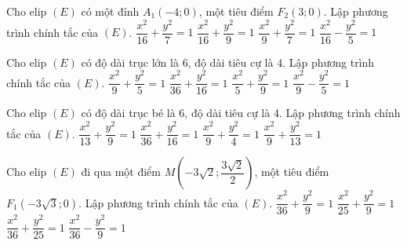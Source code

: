 \begin{ex}%
	Cho elip $(E)$ có  một đỉnh $A_1(-4;0)$, một tiêu điểm $F_2(3;0)$. Lập phương trình chính tắc của $(E)$.
	 \choice
		{ \True $\dfrac{x^2}{16}+\dfrac{y^2}{7}=1$} 
		 {$\dfrac{x^2}{16}+\dfrac{y^2}{9}=1$}
		{  $\dfrac{x^2}{9}+\dfrac{y^2}{7}=1$}
		{$\dfrac{x^2}{16}-\dfrac{y^2}{5}=1$} 
\end{ex}

\begin{ex}%
	Cho elip $(E)$ có độ dài trục lớn là $6$, độ dài  tiêu cự là $4$. Lập phương trình chính tắc của $(E)$.
	\choice 
		 { \True $\dfrac{x^2}{9}+\dfrac{y^2}{5}=1$}
		 {$\dfrac{x^2}{36}+\dfrac{y^2}{16}=1$}
		{  $\dfrac{x^2}{5}+\dfrac{y^2}{9}=1$}
		 {$\dfrac{x^2}{9}-\dfrac{y^2}{5}=1$}
\end{ex}

\begin{ex}%
	Cho  elip $(E)$ có độ dài trục bé là $6$, độ dài tiêu cự là $4$. Lập phương trình chính tắc của $(E)$.
	 \choice
		 { \True $\dfrac{x^2}{13}+\dfrac{y^2}{9}=1$}
		{$\dfrac{x^2}{36}+\dfrac{y^2}{16}=1$} 
		{ $\dfrac{x^2}{9}+\dfrac{y^2}{4}=1$} 
		 {$\dfrac{x^2}{9}+\dfrac{y^2}{13}=1$}
\end{ex}

\begin{ex}%
	Cho elip $(E)$ đi qua một điểm $M\left(-3\sqrt{2};\dfrac{3\sqrt{2}}{2}\right)$, một tiêu điểm  $F_1\left(-3\sqrt{3};0\right)$. Lập phương trình chính tắc của $(E)$.
	 \choice
		 { \True $\dfrac{x^2}{36}+\dfrac{y^2}{9}=1$}
		 {$\dfrac{x^2}{25}+\dfrac{y^2}{9}=1$}
		{ $\dfrac{x^2}{36}+\dfrac{y^2}{25}=1$} 
		{$\dfrac{x^2}{36}-\dfrac{y^2}{9}=1$} 
\end{ex}

